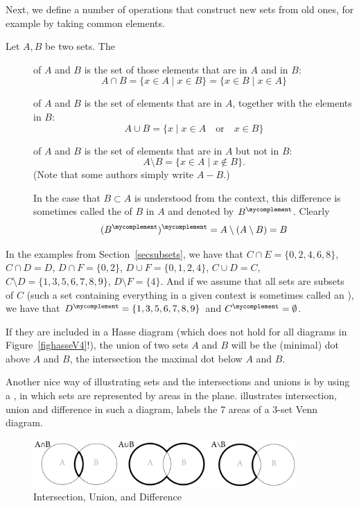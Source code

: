 Next, we define a number of operations that construct new sets from old
ones, for example by taking common elements.
\begin{defn}
Let $A,B$ be two sets. The
\begin{description}
\item[] of $A$ and $B$ is the set of those elements
that are in $A$ and in $B$:
\[
A\cap B=\{x\in A\mid x\in B\}=\{x\in B\mid x\in A\}
\]
\item[] of $A$ and $B$ is the set of elements
that are in $A$, together with the elements in $B$:
\[
A\cup B=\{x\mid x\in A\quad\mbox{or}\quad x\in B\}
\]
\item[] of $A$ and $B$ is the set of elements that are in
$A$ but not in $B$:
\[
A\setminus B=\{x\in A\mid x\not\in B\}.
\]
(Note that some authors simply write $A-B$.)

In the case that $B\subset A$ is understood from the context, this difference is sometimes called
the  of $B$ in $A$ and denoted by $B^\mycomplement$.
Clearly 
\[
(B^\mycomplement)^\mycomplement=A\setminus(A\setminus B)=B
\]
\end{description}
\end{defn}
In the examples from Section~\ref{secsubsets}, we have that
$C\cap E=\{0,2,4,6,8\}$, $C\cap D=D$, $D\cap
F=\{0,2\}$, $D\cup F=\{0,1,2,4\}$, $C\cup D=C$, $C\setminus
D=\{1,3,5,6,7,8,9\}$, $D\setminus F=\{4\}$.
And if we assume that all sets are subsets of $C$ (such a set containing
everything in a given context is sometimes called an ), we
have that $D^\mycomplement=\{1,3,5,6,7,8,9\}$ and $C^\mycomplement=\emptyset$.

If they are included in a Hasse diagram (which does not hold for all
diagrams in Figure~\ref{fighasseV4}!), the union of two sets $A$ and $B$
will be the (minimal) dot above $A$ and $B$, the intersection the maximal
dot below $A$ and $B$. 
\medskip

Another nice way of illustrating sets and the intersections and unions
is by using a , in which sets are represented by areas in the plane.
 illustrates intersection, union and difference in
such a diagram,  labels the 7 areas of a 3-set Venn
diagram.

\begin{figure}[t]
\begin{center}
\includegraphics[width=10cm]{pic/VennMulti.pdf}
\end{center}
\caption{Intersection, Union, and Difference}
\label{figvennmulti}
\end{figure}

